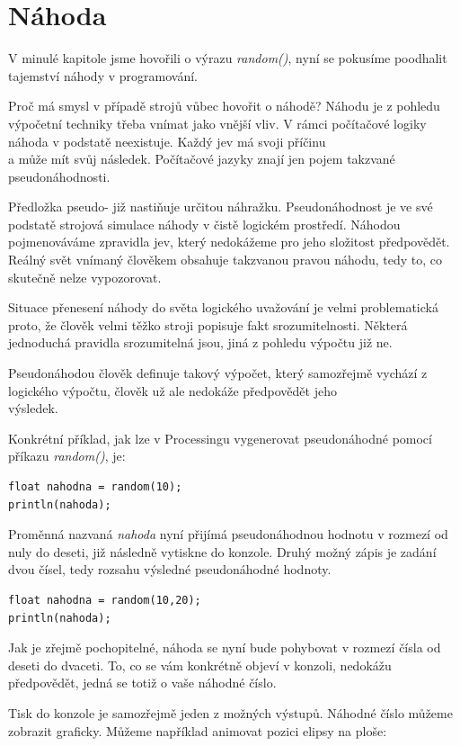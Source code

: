\documentclass[10pt,twoside=true,open=right,cleardoublepage=empty,chapterprefix=true]{scrbook}
\newcommand{\oddil}[1]{\section{#1}\index{#1}\label{#1}}
\newcommand{\vyraz}[1]{\textit{\gls{#1}}\index{#1}\label{#1}}
\begin{document}
\oddil{Náhoda}

V minulé kapitole jsme hovořili o výrazu \vyraz{random()}, nyní se pokusíme poodhalit tajemství náhody v programování.

Proč má smysl v případě strojů vůbec hovořit o náhodě? Náhodu je z pohledu výpočetní techniky třeba vnímat jako vnější vliv. V rámci počítačové logiky náhoda v podstatě neexistuje. Každý jev má svoji příčinu \\a může mít svůj následek. Počítačové jazyky znají jen pojem takzvané pseudonáhodnosti.

Předložka pseudo- již nastiňuje určitou náhražku. Pseudonáhodnost je ve své podstatě strojová simulace náhody v čistě logickém prostředí. Náhodou pojmenováváme zpravidla jev, který nedokážeme pro jeho složitost předpovědět. Reálný svět vnímaný člověkem obsahuje takzvanou pravou náhodu, tedy to, co skutečně nelze vypozorovat.

Situace přenesení náhody do světa logického uvažování je velmi problematická proto, že člověk velmi těžko stroji popisuje fakt srozumitelnosti. Některá jednoduchá pravidla srozumitelná jsou, jiná z pohledu výpočtu již ne.

Pseudonáhodou člověk definuje takový výpočet, který samozřejmě vychází z logického výpočtu, člověk už ale nedokáže předpovědět jeho \\výsledek.

Konkrétní příklad, jak lze v Processingu vygenerovat pseudonáhodné pomocí příkazu \vyraz{random()}, je:

\begin{lstlisting}
float nahodna = random(10);
println(nahoda);
\end{lstlisting}

Proměnná nazvaná {\em nahoda} nyní přijímá pseudonáhodnou hodnotu v rozmezí od nuly do deseti, již následně vytiskne do konzole. Druhý možný zápis je zadání dvou čísel, tedy rozsahu výsledné pseudonáhodné hodnoty.


\begin{lstlisting}
float nahodna = random(10,20);
println(nahoda);
\end{lstlisting}

Jak je zřejmě pochopitelné, náhoda se nyní bude pohybovat v rozmezí čísla od deseti do dvaceti. To, co se vám konkrétně objeví v konzoli, nedokážu předpovědět, jedná se totiž o vaše náhodné číslo.

Tisk do konzole je samozřejmě jeden z možných výstupů. Náhodné číslo můžeme zobrazit graficky. Můžeme například animovat pozici elipsy na ploše:
\end{document}
